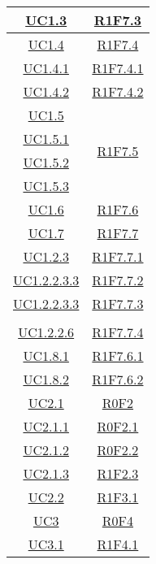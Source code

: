 \begin{longtable}{|c|c|}
	\hline
	\hyperlink{UC1.3}{UC1.3} & \hyperlink{R1F7.3}{R1F7.3} \\
	\hline
	\hyperlink{UC1.4}{UC1.4} & \hyperlink{R1F7.4}{R1F7.4} \\
	\hline
	\hyperlink{UC1.4.1}{UC1.4.1} & \hyperlink{R1F7.4.1}{R1F7.4.1}\\
	\hline
	\hyperlink{UC1.4.2}{UC1.4.2} & \hyperlink{R1F7.4.2}{R1F7.4.2}\\
	\hline
	\hyperlink{UC1.5}{UC1.5} & \multirow{4}{*}{\hyperlink{R1F7.5}{R1F7.5}}\\
	\hyperlink{UC1.5.1}{UC1.5.1} &\\
	\hyperlink{UC1.5.2}{UC1.5.2} &\\
	\hyperlink{UC1.5.3}{UC1.5.3} &\\
	\hline
	\hyperlink{UC1.6}{UC1.6} & \hyperlink{R1F7.6}{R1F7.6} \\
	\hline
	\hyperlink{UC1.7}{UC1.7} & \hyperlink{R1F7.7}{R1F7.7}\\
	\hline
	\hyperlink{UC1.2.3}{UC1.2.3} & \hyperlink{R1F7.7.1}{R1F7.7.1} \\
	\hline
	\hyperlink{UC1.2.2.3.3}{UC1.2.2.3.3} & \hyperlink{R1F7.7.2}{R1F7.7.2} \\
	\hline
	\hyperlink{UC1.2.2.3.3}{UC1.2.2.3.3} & \hyperlink{R1F7.7.3}{R1F7.7.3}\\
	\hline
	\begin{tabular}{c}
		\hyperlink{UC1.2.2.5}{UC1.2.2.5} \\ \hyperlink{UC1.2.2.6}{UC1.2.2.6}
	\end{tabular} & \hyperlink{R1F7.7.4}{R1F7.7.4}\\
	\hline
	\hyperlink{UC1.8.1}{UC1.8.1} & \hyperlink{R1F7.6.1}{R1F7.6.1} \\
	\hline
	\hyperlink{UC1.8.2}{UC1.8.2} & \hyperlink{R1F7.6.2}{R1F7.6.2} \\
	\hline
	\hyperlink{UC2.1}{UC2.1} & \hyperlink{R0F2}{R0F2}\\
	\hline
	\hyperlink{UC2.1.1}{UC2.1.1} & \hyperlink{R0F2.1}{R0F2.1}\\
	\hline
	\hyperlink{UC2.1.2}{UC2.1.2} & \hyperlink{R0F2.2}{R0F2.2}\\
	\hline
	\hyperlink{UC2.1.3}{UC2.1.3} & \hyperlink{R1F2.3}{R1F2.3}\\
	\hline
	\hyperlink{UC2.2}{UC2.2} & \hyperlink{R1F3.1}{R1F3.1}\\
	\hline
	\hyperlink{UC3}{UC3} & \hyperlink{R0F4}{R0F4}\\
	\hline
	\hyperlink{UC3.1}{UC3.1} & \hyperlink{R1F4.1}{R1F4.1}\\

\end{longtable}
